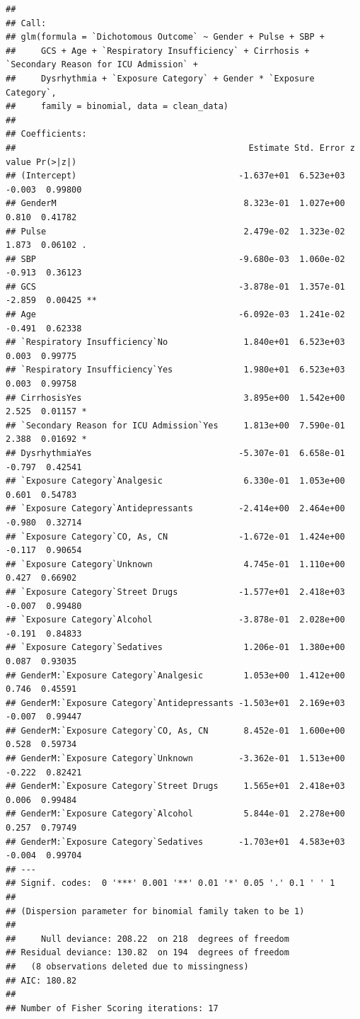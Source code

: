 \documentclass[
]{article}
\begin{document}
\begin{verbatim}
## 
## Call:
## glm(formula = `Dichotomous Outcome` ~ Gender + Pulse + SBP + 
##     GCS + Age + `Respiratory Insufficiency` + Cirrhosis + `Secondary Reason for ICU Admission` + 
##     Dysrhythmia + `Exposure Category` + Gender * `Exposure Category`, 
##     family = binomial, data = clean_data)
## 
## Coefficients:
##                                              Estimate Std. Error z value Pr(>|z|)   
## (Intercept)                                -1.637e+01  6.523e+03  -0.003  0.99800   
## GenderM                                     8.323e-01  1.027e+00   0.810  0.41782   
## Pulse                                       2.479e-02  1.323e-02   1.873  0.06102 . 
## SBP                                        -9.680e-03  1.060e-02  -0.913  0.36123   
## GCS                                        -3.878e-01  1.357e-01  -2.859  0.00425 **
## Age                                        -6.092e-03  1.241e-02  -0.491  0.62338   
## `Respiratory Insufficiency`No               1.840e+01  6.523e+03   0.003  0.99775   
## `Respiratory Insufficiency`Yes              1.980e+01  6.523e+03   0.003  0.99758   
## CirrhosisYes                                3.895e+00  1.542e+00   2.525  0.01157 * 
## `Secondary Reason for ICU Admission`Yes     1.813e+00  7.590e-01   2.388  0.01692 * 
## DysrhythmiaYes                             -5.307e-01  6.658e-01  -0.797  0.42541   
## `Exposure Category`Analgesic                6.330e-01  1.053e+00   0.601  0.54783   
## `Exposure Category`Antidepressants         -2.414e+00  2.464e+00  -0.980  0.32714   
## `Exposure Category`CO, As, CN              -1.672e-01  1.424e+00  -0.117  0.90654   
## `Exposure Category`Unknown                  4.745e-01  1.110e+00   0.427  0.66902   
## `Exposure Category`Street Drugs            -1.577e+01  2.418e+03  -0.007  0.99480   
## `Exposure Category`Alcohol                 -3.878e-01  2.028e+00  -0.191  0.84833   
## `Exposure Category`Sedatives                1.206e-01  1.380e+00   0.087  0.93035   
## GenderM:`Exposure Category`Analgesic        1.053e+00  1.412e+00   0.746  0.45591   
## GenderM:`Exposure Category`Antidepressants -1.503e+01  2.169e+03  -0.007  0.99447   
## GenderM:`Exposure Category`CO, As, CN       8.452e-01  1.600e+00   0.528  0.59734   
## GenderM:`Exposure Category`Unknown         -3.362e-01  1.513e+00  -0.222  0.82421   
## GenderM:`Exposure Category`Street Drugs     1.565e+01  2.418e+03   0.006  0.99484   
## GenderM:`Exposure Category`Alcohol          5.844e-01  2.278e+00   0.257  0.79749   
## GenderM:`Exposure Category`Sedatives       -1.703e+01  4.583e+03  -0.004  0.99704   
## ---
## Signif. codes:  0 '***' 0.001 '**' 0.01 '*' 0.05 '.' 0.1 ' ' 1
## 
## (Dispersion parameter for binomial family taken to be 1)
## 
##     Null deviance: 208.22  on 218  degrees of freedom
## Residual deviance: 130.82  on 194  degrees of freedom
##   (8 observations deleted due to missingness)
## AIC: 180.82
## 
## Number of Fisher Scoring iterations: 17
\end{verbatim}
\end{document}
